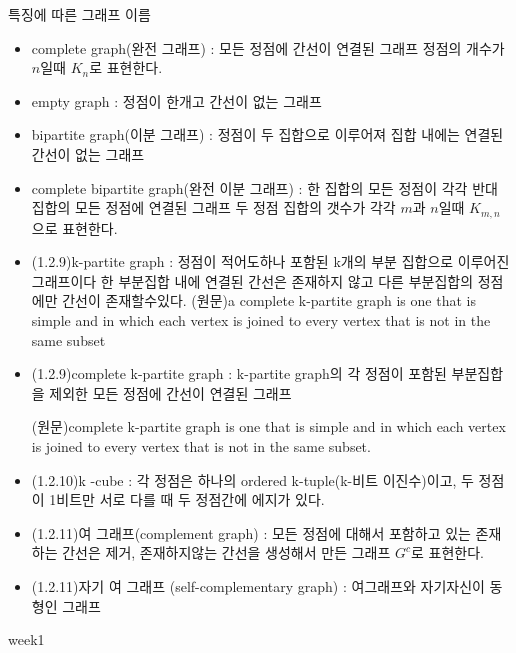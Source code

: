 \begin{dfn} 특징에 따른 그래프 이름
    \begin{itemize}
        \item complete graph(완전 그래프) : 모든 정점에 간선이 연결된 그래프 정점의 개수가 $n$일때 $K_n$로 표현한다.
        \item empty graph : 정점이 한개고 간선이 없는 그래프
        \item bipartite graph(이분 그래프) : 정점이 두 집합으로 이루어져 집합 내에는 연결된 간선이 없는 그래프
        \item complete bipartite graph(완전 이분 그래프) : 한 집합의 모든 정점이 각각 반대 집합의 모든 정점에 연결된 그래프 두 정점 집합의 갯수가 각각 $m$과  $n$일때 $K_{m,n}$으로 표현한다.
        \item (1.2.9)k-partite graph : 정점이 적어도하나 포함된 k개의 부분 집합으로 이루어진 그래프이다  한 부분집합 내에 연결된 간선은 존재하지 않고 다른 부분집합의 정점에만 간선이 존재할수있다.
        (원문)a complete k-partite graph is one that is simple and in which each vertex is
        joined to every vertex that is not in the same subset
        \item (1.2.9)complete k-partite graph : k-partite graph의 각 정점이 포함된 부분집합을 제외한 모든 정점에 간선이 연결된 그래프 
        
        (원문)complete k-partite graph is one that is simple and in which each vertex is
        joined to every vertex that is not in the same subset.

        \item (1.2.10)k -cube : 각 정점은 하나의 ordered k-tuple(k-비트 이진수)이고, 두 정점이 1비트만 서로 다를 때 두 정점간에 에지가 있다.
        \item (1.2.11)여 그래프(complement graph) : 모든 정점에 대해서 포함하고 있는 존재하는 간선은 제거, 존재하지않는 간선을 생성해서 만든 그래프 
        $G^{c}$로 표현한다.
        \item (1.2.11)자기 여 그래프 (self-complementary graph) : 여그래프와 자기자신이 동형인 그래프
    \end{itemize}
\end{dfn}

week1

\subsubsection{}
\subsubsection{}

